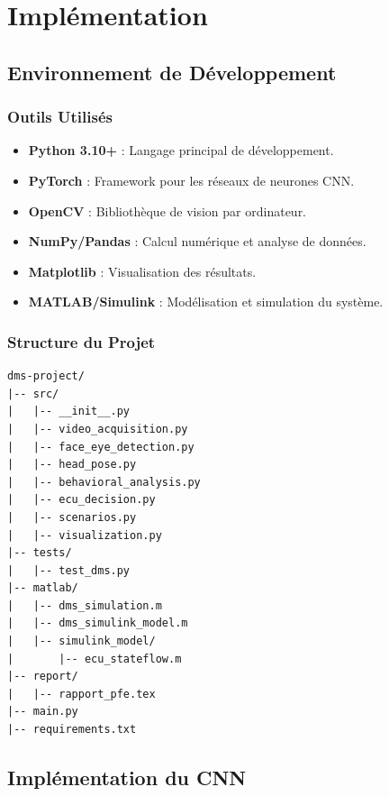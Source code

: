 \documentclass[12pt,a4paper]{report}
\begin{document}
\chapter{Implémentation}

\section{Environnement de Développement}

\subsection{Outils Utilisés}
\begin{itemize}
    \item \textbf{Python 3.10+} : Langage principal de développement.
    \item \textbf{PyTorch} : Framework pour les réseaux de neurones CNN.
    \item \textbf{OpenCV} : Bibliothèque de vision par ordinateur.
    \item \textbf{NumPy/Pandas} : Calcul numérique et analyse de données.
    \item \textbf{Matplotlib} : Visualisation des résultats.
    \item \textbf{MATLAB/Simulink} : Modélisation et simulation du système.
\end{itemize}

\subsection{Structure du Projet}

\begin{lstlisting}[language={}, caption={Structure du projet.}]
dms-project/
|-- src/
|   |-- __init__.py
|   |-- video_acquisition.py
|   |-- face_eye_detection.py
|   |-- head_pose.py
|   |-- behavioral_analysis.py
|   |-- ecu_decision.py
|   |-- scenarios.py
|   |-- visualization.py
|-- tests/
|   |-- test_dms.py
|-- matlab/
|   |-- dms_simulation.m
|   |-- dms_simulink_model.m
|   |-- simulink_model/
|       |-- ecu_stateflow.m
|-- report/
|   |-- rapport_pfe.tex
|-- main.py
|-- requirements.txt
\end{lstlisting}

\section{Implémentation du CNN}
\end{document}
